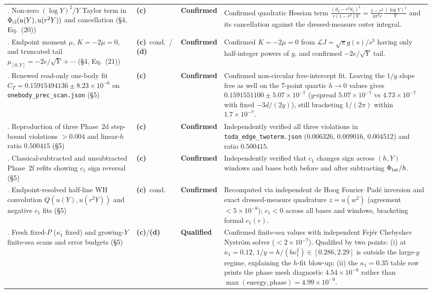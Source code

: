 \documentclass[11pt,a4paper]{article}
\newcommand{\C}{\textbf{(c)}}
\newcommand{\D}{\textbf{(d)}}
\newcommand{\scr}[1]{\texttt{#1}}
\begin{document}
\begin{center}
\begin{longtable}{>{\raggedright\arraybackslash}p{3.1cm} >{\raggedright\arraybackslash}p{1.5cm} >{\raggedright\arraybackslash}p{1.9cm} >{\raggedright\arraybackslash}p{7.6cm}}
\addlinespace
6. Non-zero $(\log Y)^2/Y$ Taylor term in $\Phi_{\rm cl}(u(Y),u(r^2Y))$ and cancellation (\S4, Eq.~(20)) & \C & \textbf{Confirmed} & Confirmed quadratic Hessian term $\frac{(d_2-r^2d_1)^2}{r(1-r^2)Y}=\frac{1-r^2}{4\pi^2 r}\frac{(\log Y)^2}{Y}$ and its cancellation against the dressed-measure outer integral. \\
\addlinespace
7. Endpoint moment $\mu$, $K=-2\mu=0$, and truncated tail $\mu_{[0,Y]}=-2e/\sqrt{Y}+\cdots$ (\S4, Eq.~(21)) & \C\ cond.\ / \D & \textbf{Confirmed} & Confirmed $K=-2\mu=0$ from $\mathcal L J=\sqrt{\pi}g(s)/s^3$ having only half-integer powers of $y$, and confirmed $-2e/\sqrt{Y}$ tail. \\
\addlinespace
8. Renewed read-only one-body fit $C_T=0.15915494136\pm 8.23\times 10^{-6}$ on \scr{onebody\_prec\_scan.json} (\S5) & \C & \textbf{Confirmed} & Confirmed non-circular free-intercept fit. Leaving the $1/y$ slope free as well on the 7-point quartic $h\to 0$ values gives $0.1591551100\pm 5.07\times 10^{-7}$ ($y$-spread $5.07\times 10^{-7}$ vs $4.73\times 10^{-7}$ with fixed $-3d/(2y)$), still bracketing $1/(2\pi)$ within $1.7\times 10^{-7}$. \\
\addlinespace
9. Reproduction of three Phase~2d step-bound violations $>0.004$ and linear-$h$ ratio $0.500415$ (\S5) & \C & \textbf{Confirmed} & Independently verified all three violations in \scr{toda\_edge\_twoterm.json} ($0.006326$, $0.009016$, $0.004512$) and ratio $0.500415$. \\
\addlinespace
10. Classical-subtracted and unsubtracted Phase~2f refits showing $c_1$ sign reversal (\S5) & \C & \textbf{Confirmed} & Independently verified that $c_1$ changes sign across $(h,Y)$ windows and bases both before and after subtracting $\Phi_{\rm lat}/h$. \\
\addlinespace
11. Endpoint-resolved half-line WH convolution $Q(u(Y),u(r^2Y))$ and negative $c_1$ fits (\S5) & \C\ cond. & \textbf{Confirmed} & Recomputed via independent de Hoog Fourier--Pad\'e inversion and exact dressed-measure quadrature $z=u(w^2)$ (agreement $<5\times 10^{-8}$); $c_1<0$ across all bases and windows, bracketing formal $c_1(r)$. \\
\addlinespace
12. Fresh fixed-$P$ ($\kappa_1$ fixed) and growing-$Y$ finite-sea scans and error budgets (\S5) & \C/\D & \textbf{Qualified} & Confirmed finite-sea values with independent Fej\'er Chebyshev Nystr\"om solver ($<2\times 10^{-7}$). Qualified by two points: (i) at $\kappa_1=0.12$, $1/y=h/(b\kappa_1^2)\in[0.286,2.29]$ is outside the large-$y$ regime, explaining the $h$-fit blow-up; (ii) the $\kappa_1=0.35$ table row prints the phase mesh diagnostic $4.54\times 10^{-9}$ rather than $\max(\text{energy},\text{phase})=4.99\times 10^{-9}$. \\
\bottomrule
\end{longtable}
\end{center}
\end{document}

